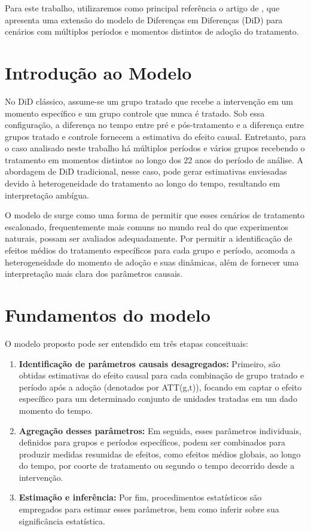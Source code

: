 \documentclass[
	12pt,				%
	oneside,			%
	a4paper,			%
	english,			%
	french,				%
	spanish,			%
	brazil				%
	]{abntex2}
\begin{document}
Para este trabalho, utilizaremos como principal referência o artigo de , que apresenta uma extensão do modelo de Diferenças em Diferenças (DiD) para cenários com múltiplos períodos e momentos distintos de adoção do tratamento.

\section{Introdução ao Modelo}

No DiD clássico, assume-se um grupo tratado que recebe a intervenção em um momento específico e um grupo controle que nunca é tratado. Sob essa configuração, a diferença no tempo entre pré e pós-tratamento e a diferença entre grupos tratado e controle fornecem a estimativa do efeito causal. Entretanto, para o caso analisado neste trabalho há múltiplos períodos e vários grupos recebendo o tratamento em momentos distintos ao longo dos 22 anos do período de análise. A abordagem de DiD tradicional, nesse caso, pode gerar estimativas enviesadas devido à heterogeneidade do tratamento ao longo do tempo, resultando em interpretação ambígua.

O modelo de  surge como uma forma de permitir que esses cenários de tratamento escalonado, frequentemente mais comuns no mundo real do que experimentos naturais, possam ser avaliados adequadamente. Por permitir a identificação de efeitos médios do tratamento específicos para cada grupo e período, acomoda a heterogeneidade do momento de adoção e suas dinâmicas, além de fornecer uma interpretação mais clara dos parâmetros causais.

\section{Fundamentos do modelo}

O modelo proposto pode ser entendido em três etapas conceituais:

\begin{enumerate}
\item \textbf{Identificação de parâmetros causais desagregados:} Primeiro, são obtidas estimativas do efeito causal para cada combinação de grupo tratado e período após a adoção (denotados por ATT(g,t)), focando em captar o efeito específico para um determinado conjunto de unidades tratadas em um dado momento do tempo.

\item \textbf{Agregação desses parâmetros:} Em seguida, esses parâmetros individuais, definidos para grupos e períodos específicos, podem ser combinados para produzir medidas resumidas de efeitos, como efeitos médios globais, ao longo do tempo, por coorte de tratamento ou segundo o tempo decorrido desde a intervenção.

\item \textbf{Estimação e inferência:} Por fim, procedimentos estatísticos são empregados para estimar esses parâmetros, bem como inferir sobre sua significância estatística.
\end{enumerate}
\end{document}
